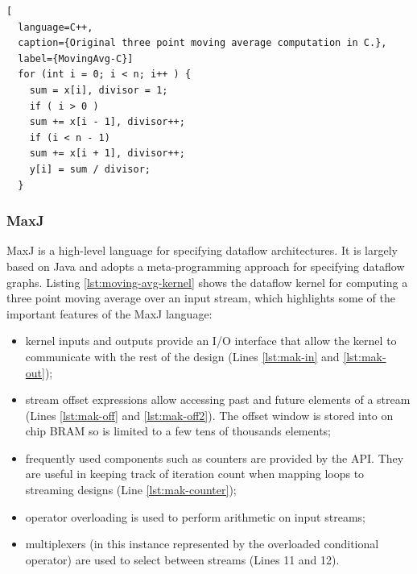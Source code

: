 \begin{lstlisting}[
  language=C++,
  caption={Original three point moving average computation in C.},
  label={MovingAvg-C}]
  for (int i = 0; i < n; i++ ) {
    sum = x[i], divisor = 1;
    if ( i > 0 )
    sum += x[i - 1], divisor++;
    if (i < n - 1)
    sum += x[i + 1], divisor++;
    y[i] = sum / divisor;
  }
\end{lstlisting}

\subsubsection{MaxJ}

MaxJ is a high-level language for specifying dataflow
architectures. It is largely based on Java and adopts a
meta-programming approach for specifying dataflow graphs.  Listing
\ref{lst:moving-avg-kernel} shows the dataflow kernel for computing a
three point moving average over an input stream, which highlights some
of the important features of the MaxJ language:

\begin{itemize}

\item kernel inputs and outputs provide an I/O interface that allow
  the kernel to communicate with the rest of the design (Lines
  \ref{lst:mak-in} and \ref{lst:mak-out});

\item stream offset expressions allow accessing past and future
  elements of a stream (Lines \ref{lst:mak-off} and
  \ref{lst:mak-off2}). The offset window is stored into on chip BRAM
  so is limited to a few tens of thousands elements;

\item frequently used components such as counters are provided by the
  API. They are useful in keeping track of iteration count when
  mapping loops to streaming designs (Line \ref{lst:mak-counter});

\item operator overloading is used to perform arithmetic on input streams;

\item multiplexers (in this instance represented by the overloaded
  conditional operator) are used to select between streams (Lines 11
  and 12).

\end{itemize}

